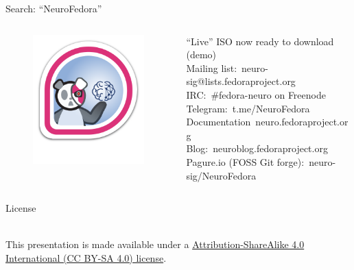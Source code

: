 \begin{frame}[c]{Search: \enquote{NeuroFedora}}
  \begin{columns}
   \begin{column}{0.3\textwidth}
      \begin{figure}[h]
        \centering
        \includegraphics[width=\linewidth]{images/NeuroFedoraBadge.png}
      \end{figure}
    \end{column}
    \begin{column}{0.8\textwidth}
      \textcolor{FeaturesOrange}{\enquote{Live} ISO now ready to download (demo)}\\
      \textcolor{FedoraBlue}{Mailing list:\ neuro-sig@lists.fedoraproject.org}\\
      \textcolor{FirstGreen}{IRC:\ \#fedora-neuro on Freenode}\\
      \textcolor{FeaturesOrange}{Telegram:\ t.me/NeuroFedora}\\
      \textcolor{FriendsMagenta}{Documentation\ neuro.fedoraproject.org}\\
      \textcolor{FirstGreen}{Blog:\ neuroblog.fedoraproject.org}\\
      \textcolor{FeaturesOrange}{Pagure.io (FOSS Git forge):\ neuro-sig/NeuroFedora}
    \end{column}
  \end{columns}
\end{frame}
\begin{frame}[c]{License}
  \begin{center}
    \ccbysa{}\\
    \vspace{0.5cm}
    This presentation is made available under a \href{https://creativecommons.org/licenses/by-sa/4.0/}{Attribution-ShareAlike 4.0 International (CC BY-SA 4.0) license}.\\
  \end{center}
\end{frame}

